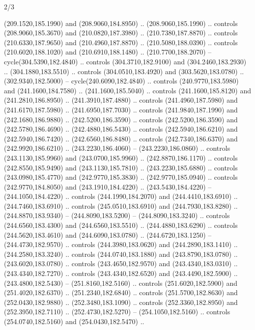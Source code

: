 \begin{flagdescription}{2/3}
\begin{scope}[xshift=0.5\flaglength,yshift=0.5\flagwidth,scale=\flagwidth/259.2]
\begin{scope}[y=0.8pt, x=0.8pt, yscale=-1,shift={(-243,-162)}]
      (209.1520,185.1990) and (208.9060,184.8950) .. (208.9060,185.1990) .. controls
      (208.9060,185.3670) and (210.0820,187.3980) .. (210.7380,187.8870) .. controls
      (210.6330,187.9650) and (210.4960,187.8870) .. (210.5080,188.0390) .. controls
      (210.6020,188.1020) and (210.6910,188.1480) .. (210.7700,188.2070) --
      cycle(304.5390,182.4840) .. controls (304.3710,182.9100) and
      (304.2460,183.2930) .. (304.1880,183.5510) .. controls (304.0510,183.4920) and
      (303.5620,183.0780) .. (302.9340,182.5000) -- cycle(240.6090,182.4840) ..
      controls (240.9770,183.5980) and (241.1600,184.7580) .. (241.1600,185.5040) ..
      controls (241.1600,185.8120) and (241.2810,186.8950) .. (241.3910,187.4880) ..
      controls (241.4960,187.5980) and (241.6170,187.5980) .. (241.6950,187.7030) ..
      controls (241.9840,187.1990) and (242.1680,186.9880) .. (242.5200,186.3590) ..
      controls (242.5200,186.3590) and (242.5780,186.4690) .. (242.4880,186.5430) ..
      controls (242.5940,186.6210) and (242.5940,186.7420) .. (242.6560,186.8480) ..
      controls (242.7340,186.6370) and (242.9920,186.6210) .. (243.2230,186.4060) --
      (243.2230,186.0860) .. controls (243.1130,185.9960) and (243.0700,185.9960) ..
      (242.8870,186.1170) .. controls (242.8550,185.9490) and (243.1130,185.7810) ..
      (243.2230,185.6880) .. controls (243.0980,185.4770) and (242.9770,185.3830) ..
      (242.9770,185.0940) .. controls (242.9770,184.8050) and (243.1910,184.4220) ..
      (243.5430,184.4220) -- (244.1050,184.4220) .. controls (244.1990,184.2070) and
      (244.4410,183.6910) .. (244.7460,183.6910) .. controls (245.0510,183.6910) and
      (244.7930,183.8280) .. (244.8870,183.9340) -- (244.8090,183.5200) --
      (244.8090,183.3240) .. controls (244.6560,183.4300) and (244.6560,183.5510) ..
      (244.4880,183.6290) .. controls (244.5620,183.4610) and (244.6090,183.0780) ..
      (244.6720,183.1250) -- (244.4730,182.9570) .. controls (244.3980,183.0620) and
      (244.2890,183.1410) .. (244.2580,183.3240) .. controls (244.0740,183.1880) and
      (243.8790,183.0780) .. (243.6020,183.0780) .. controls (243.4650,182.9570) and
      (243.4340,183.0310) .. (243.4340,182.7270) .. controls (243.4340,182.6520) and
      (243.4490,182.5900) .. (243.4800,182.5430) -- (251.8160,182.5160) .. controls
      (251.6020,182.5900) and (251.4020,182.6370) .. (251.2340,182.6840) .. controls
      (251.5700,182.8630) and (252.0430,182.9880) .. (252.3480,183.1090) .. controls
      (252.3360,182.8950) and (252.3950,182.7110) .. (252.4730,182.5270) --
      (254.1050,182.5160) .. controls (254.0740,182.5160) and (254.0430,182.5470) ..

\end{scope}
\end{scope}
\end{flagdescription}
